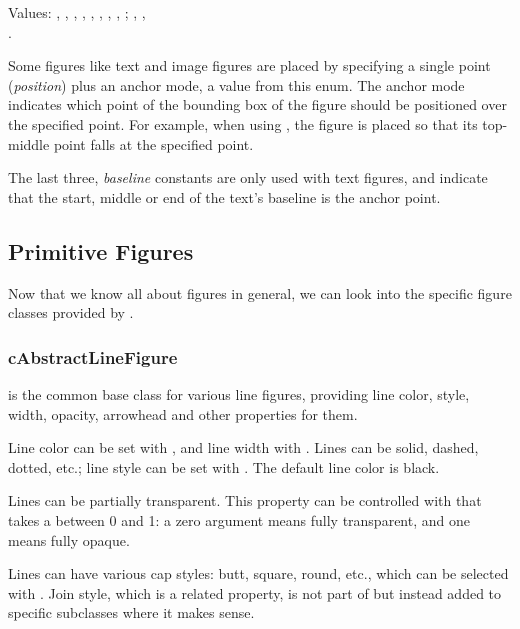 
Values:
, , , , ,
, , , ;
, , \\ .

Some figures like text and image figures are placed by specifying a single
point (\textit{position}) plus an anchor mode, a value from this enum. The
anchor mode indicates which point of the bounding box of the figure should
be positioned over the specified point. For example, when using
, the figure is placed so that its top-middle point falls at
the specified point.

The last three, \textit{baseline} constants are only used with text
figures, and indicate that the start, middle or end of the text's baseline
is the anchor point.


\subsection{Primitive Figures}
\label{sec:graphics:primitive-figures}

Now that we know all about figures in general, we can look into the
specific figure classes provided by {\opp}.

\subsubsection{cAbstractLineFigure}
\label{sec:graphics:abstractlinefigure}

 is the common base class for various line
figures, providing line color, style, width, opacity, arrowhead and other
properties for them.

Line color can be set with , and line width with
. Lines can be solid, dashed, dotted, etc.; line
style can be set with . The default line color is
black.

Lines can be partially transparent. This property can be controlled with
 that takes a  between 0 and 1: a zero
argument means fully transparent, and one means fully opaque.

Lines can have various cap styles: butt, square, round, etc., which can be
selected with . Join style, which is a related
property, is not part of  but instead added to
specific subclasses where it makes sense.

